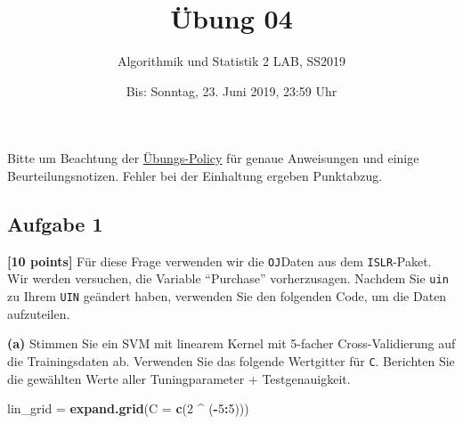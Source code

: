 \documentclass[]{article}
\title{Übung 04}
\author{Algorithmik und Statistik 2 LAB, SS2019}
\date{Bis: Sonntag, 23. Juni 2019, 23:59 Uhr}
\newenvironment{Shaded}{\begin{snugshade}}{\end{snugshade}}
\newcommand{\DataTypeTok}[1]{\textcolor[rgb]{0.13,0.29,0.53}{#1}}
\newcommand{\DecValTok}[1]{\textcolor[rgb]{0.00,0.00,0.81}{#1}}
\newcommand{\FloatTok}[1]{\textcolor[rgb]{0.00,0.00,0.81}{#1}}
\newcommand{\KeywordTok}[1]{\textcolor[rgb]{0.13,0.29,0.53}{\textbf{#1}}}
\newcommand{\NormalTok}[1]{#1}
\newcommand{\OperatorTok}[1]{\textcolor[rgb]{0.81,0.36,0.00}{\textbf{#1}}}
\newcommand{\OtherTok}[1]{\textcolor[rgb]{0.56,0.35,0.01}{#1}}
\newcommand{\StringTok}[1]{\textcolor[rgb]{0.31,0.60,0.02}{#1}}
\begin{document}
\maketitle

Bitte um Beachtung der
\href{https://weblearn.fh-kufstein.ac.at/mod/page/view.php?id=46374}{Übungs-Policy}
für genaue Anweisungen und einige Beurteilungsnotizen. Fehler bei der
Einhaltung ergeben Punktabzug.

\hypertarget{aufgabe-1}{%
\subsection{Aufgabe 1}\label{aufgabe-1}}

\textbf{{[}10 points{]}} Für diese Frage verwenden wir die
\texttt{OJ}Daten aus dem \texttt{ISLR}-Paket. Wir werden versuchen, die
Variable ``Purchase'' vorherzusagen. Nachdem Sie \texttt{uin} zu Ihrem
\texttt{UIN} geändert haben, verwenden Sie den folgenden Code, um die
Daten aufzuteilen.

\begin{Shaded}
\end{Shaded}

\textbf{(a)} Stimmen Sie ein SVM mit linearem Kernel mit 5-facher
Cross-Validierung auf die Trainingsdaten ab. Verwenden Sie das folgende
Wertgitter für \texttt{C}. Berichten Sie die gewählten Werte aller
Tuningparameter + Testgenauigkeit.

\begin{Shaded}
\begin{Highlighting}[]
\NormalTok{lin_grid =}\StringTok{ }\KeywordTok{expand.grid}\NormalTok{(}\DataTypeTok{C =} \KeywordTok{c}\NormalTok{(}\DecValTok{2} \OperatorTok{^}\StringTok{ }\NormalTok{(}\OperatorTok{-}\DecValTok{5}\OperatorTok{:}\DecValTok{5}\NormalTok{)))}
\end{Highlighting}
\end{Shaded}
\end{document}
